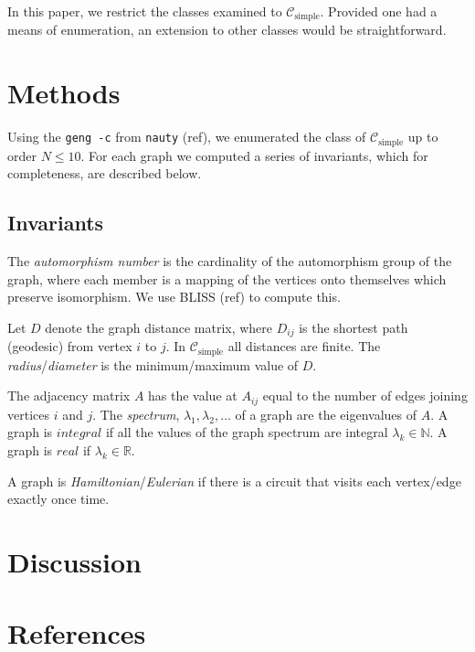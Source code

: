 \documentclass[12pt]{article}
\begin{document}
In this paper, we restrict the classes examined to $\mathcal{C}_\text{simple}$.
Provided one had a means of enumeration, an extension to other classes would be straightforward.

\section{Methods}
Using the \texttt{geng -c} from \texttt{nauty} (ref), we enumerated the class of $\mathcal{C}_\text{simple}$ up to order $N \le 10$.
For each graph we computed a series of invariants, which for completeness, are described below.

\subsection{Invariants}

The \textit{automorphism number} is the cardinality of the automorphism group of the graph, where each member is a mapping of the vertices onto themselves which preserve isomorphism. We use BLISS (ref) to compute this.

Let $D$ denote the graph distance matrix, where $D_{ij}$ is the shortest path (geodesic) from vertex $i$ to $j$.
In $\mathcal{C}_\text{simple}$ all distances are finite.
The \textit{radius}/\textit{diameter} is the minimum/maximum value of $D$.

The adjacency matrix $A$ has the value at $A_{ij}$ equal to the number of edges joining vertices $i$ and $j$.
The \textit{spectrum}, $\lambda_1, \lambda_2, \ldots$ of a graph are the eigenvalues of $A$.
A graph is $integral$ if all the values of the graph spectrum are integral $\lambda_k \in \mathbb{N}$.
A graph is $real$ if $\lambda_k \in \mathbb{R}$.

A graph is \textit{Hamiltonian}/\textit{Eulerian} if there is a circuit that visits each vertex/edge exactly once time.

\section{Discussion}


\section{References}
\end{document}
